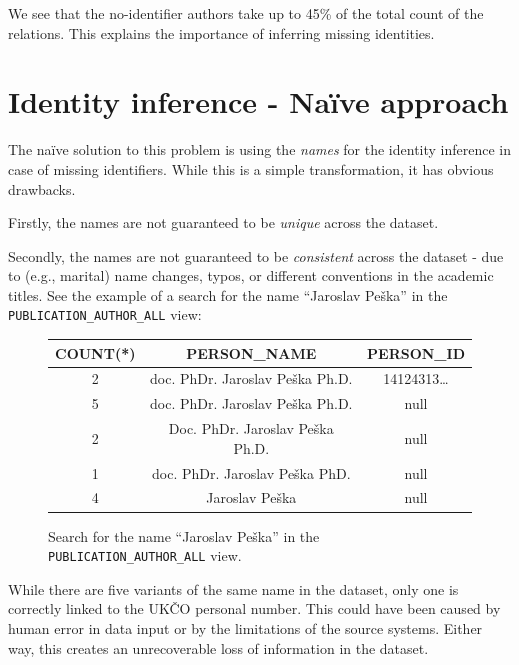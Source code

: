 We see that the no-identifier authors take up to 45\% of the total count of the relations.
This explains the importance of inferring missing identities.

\section{Identity inference - Naïve approach}\label{sec:naive-approach}

The naïve solution to this problem is using the \textit{names} for the identity inference 
in case of missing identifiers.
While this is a simple transformation, it has obvious drawbacks.

Firstly, the names are not guaranteed to be \textit{unique} across the dataset. 

Secondly, the names are not guaranteed to be \textit{consistent} across the dataset - due to (e.g., marital) name changes, 
typos, or different conventions in the academic titles.
See the example of a search for the name ``Jaroslav Peška'' in the \texttt{PUBLICATION\_AUTHOR\_ALL} view:

\begin{figure}[!ht]\label{fig:jaroslav-peska}
    \captionsetup{width=.9\linewidth}
    \centering
    \begin{tabular}{|c|c|c|}
    \hline
        COUNT(*) & PERSON\_NAME & PERSON\_ID \\ \hline
        2 & doc. PhDr. Jaroslav Peška Ph.D. & 14124313\dots \footnotemark \\ \hline
        5 & doc. PhDr. Jaroslav Peška Ph.D. & null \\ \hline
        2 & Doc. PhDr. Jaroslav Peška Ph.D. & null \\ \hline
        1 & doc. PhDr. Jaroslav Peška PhD. & null \\ \hline
        4 & Jaroslav Peška & null \\ \hline
    \end{tabular}
    \caption{Search for the name ``Jaroslav Peška'' in the \texttt{PUBLICATION\_AUTHOR\_ALL} view.}
\end{figure}


    While there are five variants of the same name in the dataset, only one is correctly linked to the \ac{UKČO} personal number.
This could have been caused by human error in data input or by the limitations of the source systems. 
Either way, this creates an unrecoverable loss of information in the dataset.

